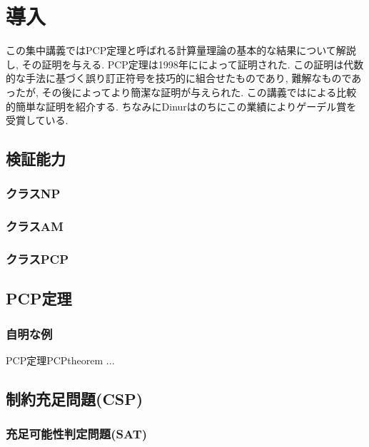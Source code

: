 \chapter{導入}

この集中講義ではPCP定理と呼ばれる計算量理論の基本的な結果について解説し, その証明を与える.
PCP定理は1998年に\citet{AroraS98,AroraLMSS98}によって証明された.
この証明は代数的な手法に基づく誤り訂正符号を技巧的に組合せたものであり, 難解なものであったが, その後\citet{Din07}によってより簡潔な証明が与えられた.
この講義では\citet{Din07}による比較的簡単な証明を紹介する.
ちなみにDinurはのちにこの業績によりゲーデル賞を受賞している.

\section{検証能力}
\subsection{クラスNP}
\subsection{クラスAM}
\subsection{クラスPCP}

\section{PCP定理}

\subsection{自明な例}

\begin{theorem}{PCP定理}{PCPtheorem}
  ...
\end{theorem}


\section{制約充足問題(CSP)}
\subsection{充足可能性判定問題(SAT)}
